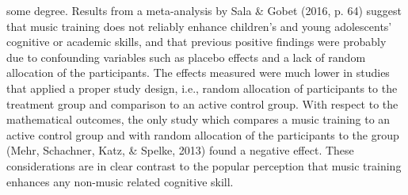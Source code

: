\documentclass[a4, 12pt]{article}
\begin{document}
some degree. Results from a meta-analysis by Sala \& Gobet (2016, p. 64) suggest that music training does not reliably enhance children's and young adolescents' cognitive or academic skills, and that previous positive findings were probably due to confounding variables such as placebo effects and a lack of random allocation of the participants. The effects measured were much lower in studies that applied a proper study design, i.e., random allocation of participants to the treatment group and comparison to an active control group. With respect to the mathematical outcomes, the only study which compares a music training to an active control group and with random allocation of the participants to the group (Mehr, Schachner, Katz, \& Spelke, 2013) found a negative effect. These considerations are in clear contrast to the popular perception that music training enhances any non-music related cognitive skill.
\end{document}

